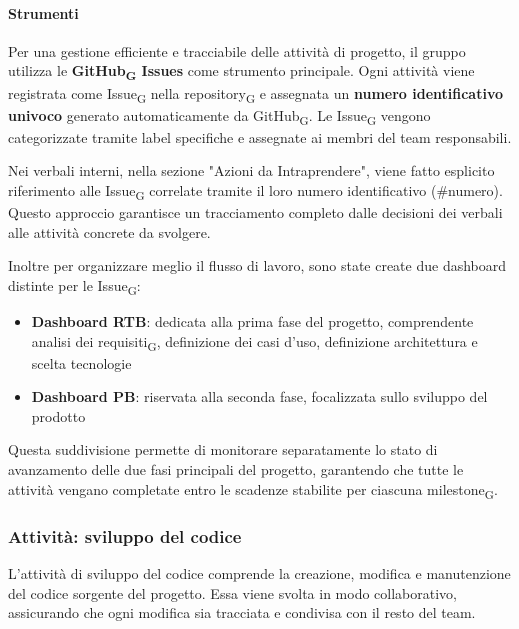 \documentclass[11pt,a4paper]{article}
\newcommand{\gls}[1]{#1\textsubscript{G}}
\begin{document}
\paragraph{Strumenti}
Per una gestione efficiente e tracciabile delle attività di progetto, il gruppo utilizza le \textbf{\gls{GitHub} Issues} come strumento principale. Ogni attività viene registrata come \gls{Issue} nella \gls{repository} e assegnata un \textbf{numero identificativo univoco} generato automaticamente da \gls{GitHub}. Le \gls{Issue} vengono categorizzate tramite label specifiche e assegnate ai membri del team responsabili.

Nei verbali interni, nella sezione "Azioni da Intraprendere", viene fatto esplicito riferimento alle \gls{Issue} correlate tramite il loro numero identificativo (\#numero). Questo approccio garantisce un tracciamento completo dalle decisioni dei verbali alle attività concrete da svolgere.

Inoltre per organizzare meglio il flusso di lavoro, sono state create due dashboard distinte per le \gls{Issue}:
\begin{itemize}
    \item \textbf{Dashboard RTB}: dedicata alla prima fase del progetto, comprendente \gls{analisi dei requisiti}, definizione dei casi d'uso, definizione architettura e scelta tecnologie
    
    \item \textbf{Dashboard PB}: riservata alla seconda fase, focalizzata sullo sviluppo del prodotto
\end{itemize}

Questa suddivisione permette di monitorare separatamente lo stato di avanzamento delle due fasi principali del progetto, garantendo che tutte le attività vengano completate entro le scadenze stabilite per ciascuna \gls{milestone}.

\subsubsection{Attività: sviluppo del codice}
L’attività di sviluppo del codice comprende la creazione, modifica e manutenzione del codice sorgente del progetto.
Essa viene svolta in modo collaborativo, assicurando che ogni modifica sia tracciata e condivisa con il resto del team.
\end{document}
